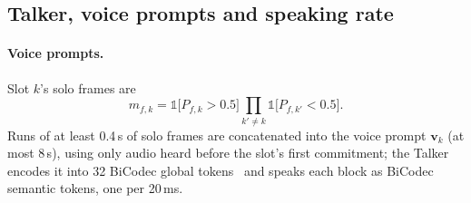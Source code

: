 \begin{table}[h]
\centering\small
\setlength{\tabcolsep}{3pt}
\caption{The offline Thinker (initialisation of the deadline Thinker) and the per-direction simultaneous Thinkers
(En$\rightarrow$Zh / Zh$\rightarrow$En rows) used in the overlap study and to produce the PA Talkers' training text.}
\label{tab:hyper2}
\end{table}

\subsection{Talker, voice prompts and speaking rate}
\label{app:train-talker}

\paragraph{Voice prompts.} Slot $k$'s solo frames are
\begin{equation}
m_{f,k}=\mathds{1}\big[P_{f,k}>0.5\big]\textstyle\prod_{k'\neq k}\mathds{1}\big[P_{f,k'}<0.5\big].
\label{eq:alone}
\end{equation}
Runs of at least 0.4\,s of solo frames are concatenated into the voice prompt $\bm{v}_k$ (at most 8\,s), using only audio
heard before the slot's first commitment; the Talker encodes it into 32 BiCodec global tokens~\citep{wang2025spark} and
speaks each block as BiCodec semantic tokens, one per 20\,ms.


